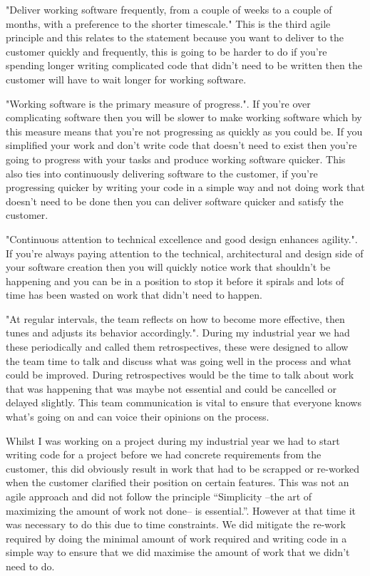\documentclass[10pt]{article}
\begin{document}
"Deliver working software frequently, from a couple of weeks to a couple of months, with a preference to the shorter timescale." This is the third agile principle and this relates to the statement because you want to deliver to the customer quickly and frequently, this is going to be harder to do if you're spending longer writing complicated code that didn't need to be written then the customer will have to wait longer for working software.

"Working software is the primary measure of progress.". If you're over complicating software then you will be slower to make working software which by this measure means that you're not progressing as quickly as you could be. If you simplified your work and don't write code that doesn't need to exist then you're going to progress with your tasks and produce working software quicker. This also ties into continuously delivering software to the customer, if you're progressing quicker by writing your code in a simple way and not doing work that doesn't need to be done then you can deliver software quicker and satisfy the customer.

"Continuous attention to technical excellence and good design enhances agility.". If you're always paying attention to the technical, architectural and design side of your software creation then you will quickly notice work that shouldn't be happening and you can be in a position to stop it before it spirals and lots of time has been wasted on work that didn't need to happen. 

"At regular intervals, the team reflects on how to become more effective, then tunes and adjusts its behavior accordingly.". During my industrial year we had these periodically and called them retrospectives, these were designed to allow the team time to talk and discuss what was going well in the process and what could be improved. During retrospectives would be the time to talk about work that was happening that was maybe not essential and could be cancelled or delayed slightly. This team communication is vital to ensure that everyone knows what's going on and can voice their opinions on the process.

Whilst I was working on a project during my industrial year we had to start writing code for a project before we had concrete requirements from the customer, this did obviously result in work that had to be scrapped or re-worked when the customer clarified their position on certain features. This was not an agile approach and did not follow the principle “Simplicity --the art of maximizing the amount of work not done-- is essential.”. However at that time it was necessary to do this due to time constraints. We did mitigate the re-work required by doing the minimal amount of work required and writing code in a simple way to ensure that we did maximise the amount of work that we didn't need to do.
\end{document}
